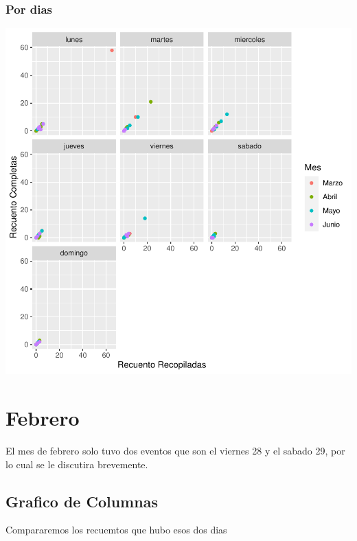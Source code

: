 \documentclass{article}
\begin{document}
\subsubsection{Por dias}

\includegraphics{seguimento2-042}

\section{Febrero}
El mes de febrero solo tuvo dos eventos que son el viernes 28 y el sabado 29, por lo cual se le discutira brevemente.

\subsection{Grafico de Columnas}
Compararemos los recuemtos que hubo esos dos dias
\end{document}
